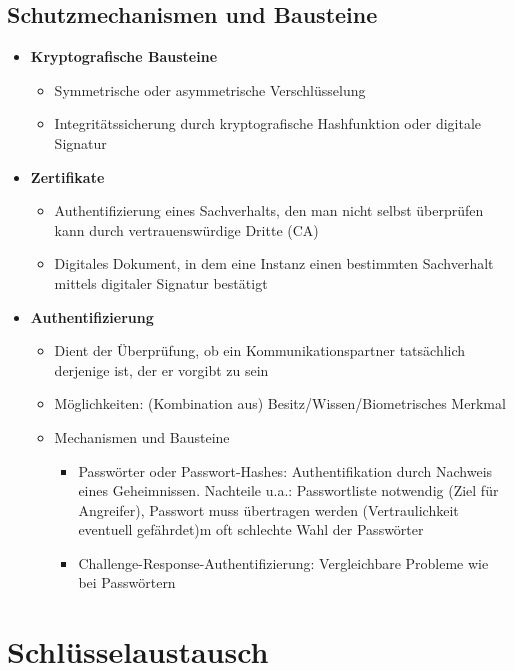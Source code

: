 \subsection{Schutzmechanismen und Bausteine}
\begin{itemize}
	\item \textbf{Kryptografische Bausteine}
	\begin{itemize}
		\item Symmetrische oder asymmetrische Verschlüsselung
		\item Integritätssicherung durch kryptografische Hashfunktion oder digitale Signatur
	\end{itemize}
	\item \textbf{Zertifikate}
	\begin{itemize}
		\item Authentifizierung eines Sachverhalts, den man nicht selbst überprüfen kann durch vertrauenswürdige Dritte (CA)
		\item Digitales Dokument, in dem eine Instanz einen bestimmten Sachverhalt mittels digitaler Signatur bestätigt
	\end{itemize}
	\item \textbf{Authentifizierung}
	\begin{itemize}
		\item Dient der Überprüfung, ob ein Kommunikationspartner tatsächlich derjenige ist, der er vorgibt zu sein
		\item Möglichkeiten: (Kombination aus) Besitz/Wissen/Biometrisches Merkmal
		\item Mechanismen und Bausteine
		\begin{itemize}
			\item Passwörter oder Passwort-Hashes: Authentifikation durch Nachweis eines Geheimnissen. Nachteile u.a.: Passwortliste notwendig (Ziel für Angreifer), Passwort muss übertragen werden (Vertraulichkeit eventuell gefährdet)m oft schlechte Wahl der Passwörter
			\item Challenge-Response-Authentifizierung: Vergleichbare Probleme wie bei Passwörtern
		\end{itemize}
	\end{itemize}
\end{itemize}



\section{Schlüsselaustausch}

